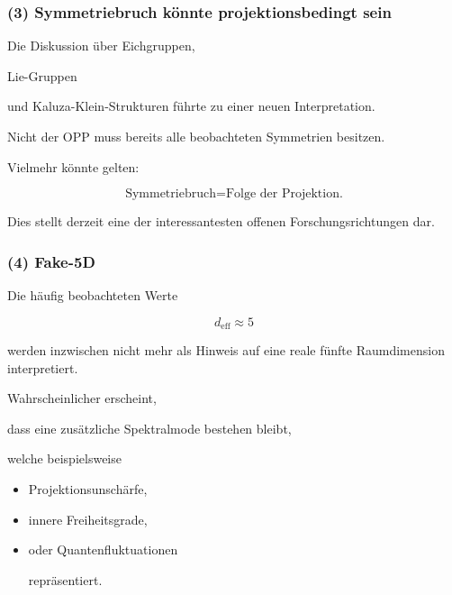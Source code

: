 
\subsubsection*{(3) Symmetriebruch könnte projektionsbedingt sein}

Die Diskussion über Eichgruppen,

Lie-Gruppen

und Kaluza-Klein-Strukturen führte zu einer neuen Interpretation.

Nicht der OPP muss bereits alle beobachteten Symmetrien besitzen.

Vielmehr könnte gelten:

\[
\boxed{
\text{Symmetriebruch}
=
\text{Folge der Projektion.}
}
\]

Dies stellt derzeit eine der interessantesten offenen Forschungsrichtungen dar.


\subsubsection*{(4) Fake-5D}

Die häufig beobachteten Werte

\[
d_{\mathrm{eff}}
\approx
5
\]

werden inzwischen nicht mehr als Hinweis auf eine reale fünfte Raumdimension interpretiert.

Wahrscheinlicher erscheint,

dass eine zusätzliche Spektralmode bestehen bleibt,

welche beispielsweise

\begin{itemize}

\item

Projektionsunschärfe,

\item

innere Freiheitsgrade,

\item

oder Quantenfluktuationen

repräsentiert.

\end{itemize}


